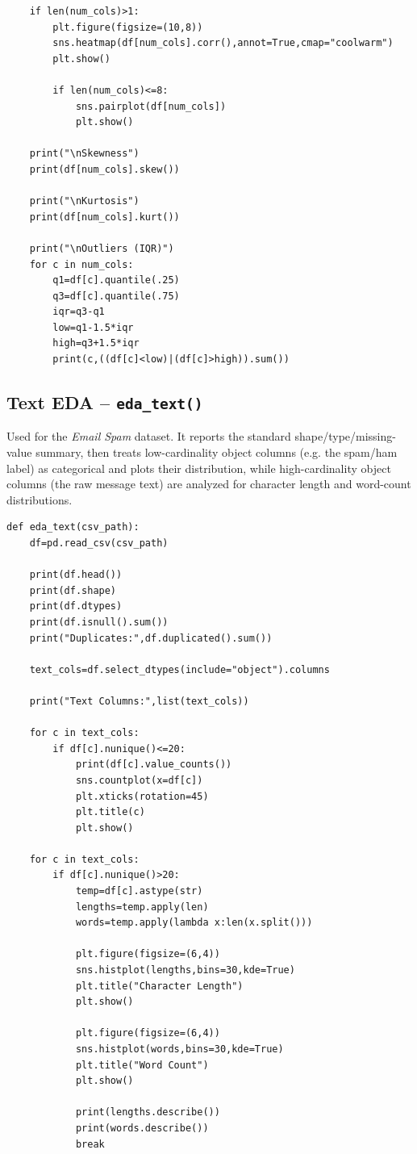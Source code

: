 \documentclass[12pt,a4paper]{article}
\begin{document}
\begin{lstlisting}
    if len(num_cols)>1:
        plt.figure(figsize=(10,8))
        sns.heatmap(df[num_cols].corr(),annot=True,cmap="coolwarm")
        plt.show()

        if len(num_cols)<=8:
            sns.pairplot(df[num_cols])
            plt.show()

    print("\nSkewness")
    print(df[num_cols].skew())

    print("\nKurtosis")
    print(df[num_cols].kurt())

    print("\nOutliers (IQR)")
    for c in num_cols:
        q1=df[c].quantile(.25)
        q3=df[c].quantile(.75)
        iqr=q3-q1
        low=q1-1.5*iqr
        high=q3+1.5*iqr
        print(c,((df[c]<low)|(df[c]>high)).sum())
\end{lstlisting}

\subsection{Text EDA -- \texttt{eda\_text()}}
Used for the \textit{Email Spam} dataset. It reports the standard shape/type/missing-value
summary, then treats low-cardinality object columns (e.g. the spam/ham label) as categorical
and plots their distribution, while high-cardinality object columns (the raw message text)
are analyzed for character length and word-count distributions.
\begin{lstlisting}
def eda_text(csv_path):
    df=pd.read_csv(csv_path)

    print(df.head())
    print(df.shape)
    print(df.dtypes)
    print(df.isnull().sum())
    print("Duplicates:",df.duplicated().sum())

    text_cols=df.select_dtypes(include="object").columns

    print("Text Columns:",list(text_cols))

    for c in text_cols:
        if df[c].nunique()<=20:
            print(df[c].value_counts())
            sns.countplot(x=df[c])
            plt.xticks(rotation=45)
            plt.title(c)
            plt.show()

    for c in text_cols:
        if df[c].nunique()>20:
            temp=df[c].astype(str)
            lengths=temp.apply(len)
            words=temp.apply(lambda x:len(x.split()))

            plt.figure(figsize=(6,4))
            sns.histplot(lengths,bins=30,kde=True)
            plt.title("Character Length")
            plt.show()

            plt.figure(figsize=(6,4))
            sns.histplot(words,bins=30,kde=True)
            plt.title("Word Count")
            plt.show()

            print(lengths.describe())
            print(words.describe())
            break
\end{lstlisting}
\end{document}
